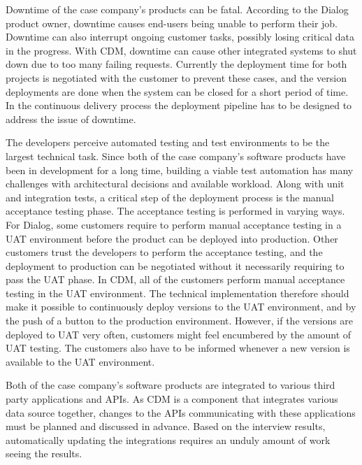 \documentclass[english]{tktltiki2}
\theoremstyle{definition}
\theoremstyle{remark}
\begin{document}
Downtime of the case company's products can be fatal. According to the Dialog product owner, downtime causes end-users being unable to perform their job. Downtime can also interrupt ongoing customer tasks, possibly losing critical data in the progress. With CDM, downtime can cause other integrated systems to shut down due to too many failing requests. Currently the deployment time for both projects is negotiated with the customer to prevent these cases, and the version deployments are done when the system can be closed for a short period of time. In the continuous delivery process the deployment pipeline has to be designed to address the issue of downtime.

The developers perceive automated testing and test environments to be the largest technical task. Since both of the case company's software products have been in development for a long time, building a viable test automation has many challenges with architectural decisions and available workload. Along with unit and integration tests, a critical step of the deployment process is the manual acceptance testing phase. The acceptance testing is performed in varying ways. For Dialog, some customers require to perform manual acceptance testing in a UAT environment before the product can be deployed into production. Other customers trust the developers to perform the acceptance testing, and the deployment to production can be negotiated without it necessarily requiring to pass the UAT phase. In CDM, all of the customers perform manual acceptance testing in the UAT environment. The technical implementation therefore should make it possible to continuously deploy versions to the UAT environment, and by the push of a button to the production environment. However, if the versions are deployed to UAT very often, customers might feel encumbered by the amount of UAT testing. The customers also have to be informed whenever a new version is available to the UAT environment.

Both of the case company's software products are integrated to various third party applications and APIs. As CDM is a component that integrates various data source together, changes to the APIs communicating with these applications must be planned and discussed in advance. Based on the interview results, automatically updating the integrations requires an unduly amount of work seeing the results. 
\end{document}
